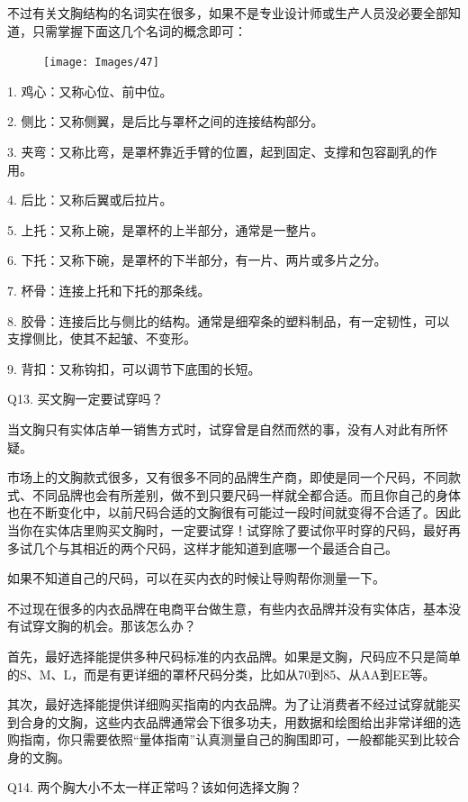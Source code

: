 \documentclass[12pt,UTF8]{ctexbook}
\begin{document}
不过有关文胸结构的名词实在很多，如果不是专业设计师或生产人员没必要全部知道，只需掌握下面这几个名词的概念即可：

\begin{figure}[htbp]
	\centering
	\texttt{[image: Images/47]}
	\caption{}
	\label{fig:1}
\end{figure}

1. 鸡心：又称心位、前中位。

2. 侧比：又称侧翼，是后比与罩杯之间的连接结构部分。

3. 夹弯：又称比弯，是罩杯靠近手臂的位置，起到固定、支撑和包容副乳的作用。

4. 后比：又称后翼或后拉片。

5. 上托：又称上碗，是罩杯的上半部分，通常是一整片。

6. 下托：又称下碗，是罩杯的下半部分，有一片、两片或多片之分。

7. 杯骨：连接上托和下托的那条线。

8. 胶骨：连接后比与侧比的结构。通常是细窄条的塑料制品，有一定韧性，可以支撑侧比，使其不起皱、不变形。

9. 背扣：又称钩扣，可以调节下底围的长短。


Q13. 买文胸一定要试穿吗？


当文胸只有实体店单一销售方式时，试穿曾是自然而然的事，没有人对此有所怀疑。

市场上的文胸款式很多，又有很多不同的品牌生产商，即使是同一个尺码，不同款式、不同品牌也会有所差别，做不到只要尺码一样就全都合适。而且你自己的身体也在不断变化中，以前尺码合适的文胸很有可能过一段时间就变得不合适了。因此当你在实体店里购买文胸时，一定要试穿！试穿除了要试你平时穿的尺码，最好再多试几个与其相近的两个尺码，这样才能知道到底哪一个最适合自己。

如果不知道自己的尺码，可以在买内衣的时候让导购帮你测量一下。

不过现在很多的内衣品牌在电商平台做生意，有些内衣品牌并没有实体店，基本没有试穿文胸的机会。那该怎么办？

首先，最好选择能提供多种尺码标准的内衣品牌。如果是文胸，尺码应不只是简单的S、M、L，而是有更详细的罩杯尺码分类，比如从70到85、从AA到EE等。

其次，最好选择能提供详细购买指南的内衣品牌。为了让消费者不经过试穿就能买到合身的文胸，这些内衣品牌通常会下很多功夫，用数据和绘图给出非常详细的选购指南，你只需要依照“量体指南”认真测量自己的胸围即可，一般都能买到比较合身的文胸。





Q14. 两个胸大小不太一样正常吗？该如何选择文胸？
\end{document}

